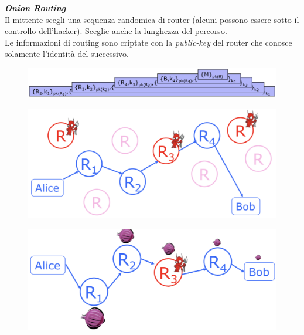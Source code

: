 \documentclass[11pt, a4paper, twoside, italian]{report}
\theoremstyle{plain}
\begin{document}
\begin{multicols}{2}
	\noindent
	\textit{\textbf{Onion Routing}}\\
	Il mittente scegli una sequenza randomica di router (alcuni possono essere sotto il controllo dell'hacker). Sceglie anche la lunghezza del percorso.\\
	Le informazioni di routing sono criptate con la \textit{public-key} del router che conosce solamente l'identità del successivo.
	\begin{figure}[H]
		\centering
		\includegraphics[scale=0.4]{onioninfo}
	\end{figure}
\columnbreak
	\begin{figure}[H]
		\centering
		\includegraphics[scale=0.25]{onion}
	\end{figure}
	\begin{figure}[H]
		\centering
		\includegraphics[scale=0.25]{onion2}
	\end{figure}
\end{multicols}
\end{document}
